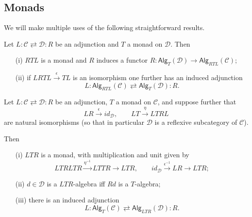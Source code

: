 \documentclass[a4paper,10pt]{article}%
\begin{document}
\subsection{Monads}

We will make multiple uses of the following straightforward results.

\begin{proposition}\label{MONADADJ1 PROP}
  Let
  $
  L \colon \mathcal{C} \rightleftarrows \mathcal{D} \colon R
  $
  be an adjunction and $T$ a monad on $\mathcal{D}$.
  Then
  \begin{itemize}
  \item[(i)] $RTL$ is a monad and $R$ induces a functor
    $R \colon \mathsf{Alg}_T(\mathcal{D}) \to \mathsf{Alg}_{RTL}(\mathcal{C})$;
  \item[(ii)] if $LRTL \xrightarrow{\epsilon} TL$ is an isomorphism one further has an induced adjunction
    \[
    L \colon \mathsf{Alg}_{RTL}(\mathcal{C})
    \rightleftarrows
    \mathsf{Alg}_{T}(\mathcal{D}) \colon R.
    \]
  \end{itemize}
\end{proposition}



\begin{proposition}\label{MONADADJ PROP}
  Let
  $
  L \colon \mathcal{C} \rightleftarrows \mathcal{D} \colon R
  $
  be an adjunction, $T$ a monad on $\mathcal{C}$, and suppose further that
  \[
  LR \xrightarrow{\epsilon} id_{\mathcal{D}}, 
  \qquad
  LT \xrightarrow{\eta} LTRL
  \]
  are natural isomorphisms 
  (so that in particular $\mathcal{D}$ is a reflexive subcategory of $\mathcal{C}$).

  Then
  \begin{itemize}
  \item[(i)] $LTR$ is a monad, with multiplication and unit given by
    \[LTRLTR \xrightarrow{\eta^{-1}} LTTR \to LTR,\qquad
    id_{\mathcal{D}} \xrightarrow{\epsilon^{-1}} LR \to LTR;
    \]
  \item[(ii)]
    $d \in \mathcal{D}$ is a $LTR$-algebra iff $Rd$ is a $T$-algebra;
  \item[(iii)] there is an induced adjunction
    \[
    L \colon \mathsf{Alg}_{T}(\mathcal{C})
    \rightleftarrows
    \mathsf{Alg}_{LTR}(\mathcal{D}) \colon R.
    \]
  \end{itemize}
\end{proposition}
\end{document}
